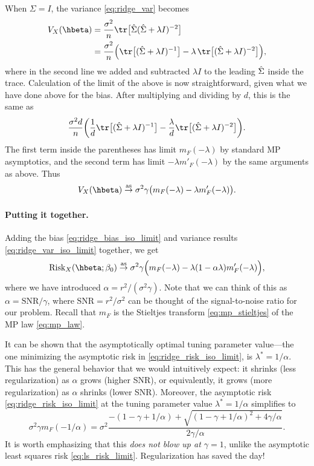 \documentclass{article}
\begin{document}
When $\Sigma = I$, the variance \eqref{eq:ridge_var} becomes 
\begin{align*}
V_X(\hbeta)
&= \frac{\sigma^2}{n} \tr \big[ \hSigma ( \hSigma + \lambda I)^{-2} \big] \\ 
&=\frac{\sigma^2}{n} \Big( \tr \big[ ( \hSigma + \lambda I)^{-1} \big] - 
\lambda \, \tr \big[ (\hSigma + \lambda I)^{-2} \big] \Big),
\end{align*}
where in the second line we added and subtracted $\lambda I$ to the leading
$\hat\Sigma$ inside the trace. Calculation of the limit of the above is now
straightforward, given what we have done above for the bias. After multiplying 
and dividing by $d$, this is the same as 
\[
\frac{\sigma^2 d}{n} \bigg( \frac{1}{d} \tr \big[ ( \hSigma + \lambda I)^{-1} 
\big] - \frac{\lambda}{d} \tr \big[ (\hSigma + \lambda I)^{-2} \big] \bigg).  
\]
The first term inside the parentheses has limit $m_F(-\lambda)$ by standard MP
asymptotics, and the second term has limit $-\lambda m'_F(-\lambda)$ by the same
arguments as above. Thus   
\begin{equation}
\label{eq:ridge_var_iso_limit}
V_X(\hbeta) \asto \sigma^2 \gamma \big( m_F(-\lambda) - \lambda 
m'_F(-\lambda) \big).
\end{equation}

\paragraph{Putting it together.}

Adding the bias \eqref{eq:ridge_bias_iso_limit} and variance results
\eqref{eq:ridge_var_iso_limit} together, we get
\begin{equation}
\label{eq:ridge_risk_iso_limit}
\Risk_X(\hbeta; \beta_0) \asto \sigma^2 \gamma 
\Big( m_F(-\lambda) - \lambda (1 - \alpha \lambda) m'_F(-\lambda) \Big), 
\end{equation}
where we have introduced $\alpha = r^2 / (\sigma^2 \gamma)$. Note that we can
think of this as $\alpha = \mathrm{SNR} / \gamma$, where $\mathrm{SNR} = r^2 /
\sigma^2$ can be thought of the signal-to-noise ratio for our problem. Recall
that $m_F$ is the Stieltjes transform \eqref{eq:mp_stieltjes} of the MP law
\eqref{eq:mp_law}. 

It can be shown that the asymptotically optimal tuning parameter value---the one
minimizing the asymptotic risk in \eqref{eq:ridge_risk_iso_limit}, is $\lambda^*
= 1/\alpha$. This has the general behavior that we would intuitively expect: it
shrinks (less regularization) as $\alpha$ grows (higher SNR), or equivalently,
it grows (more regularization) as $\alpha$ shrinks (lower SNR). Moreover, the
asymptotic risk \eqref{eq:ridge_risk_iso_limit} at the tuning parameter value
$\lambda^* = 1/\alpha$ simplifies to      
\[
\sigma^2 \gamma m_F(-1/\alpha) = \sigma^2 \frac{-(1 - \gamma + 1/\alpha) + 
  \sqrt{(1 - \gamma + 1/\alpha)^2 + 4\gamma / \alpha}}{2\gamma /\alpha}.     
\]
It is worth emphasizing that this \emph{does not blow up at $\gamma = 1$}, 
unlike the asymptotic least squares risk \eqref{eq:ls_risk_limit}. 
Regularization has saved the day! 
\end{document}
